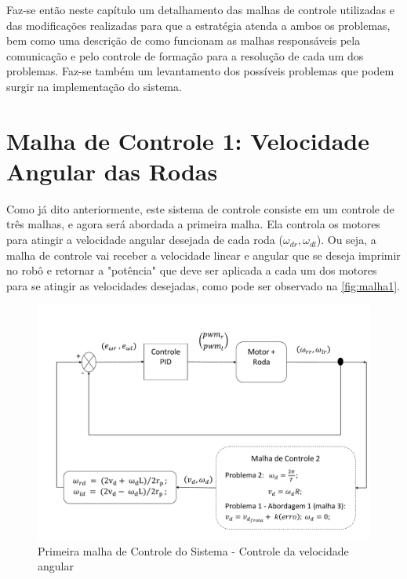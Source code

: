 Faz-se então neste capítulo um detalhamento das malhas de controle utilizadas e das modificações realizadas para que a estratégia atenda a ambos os problemas, bem como uma descrição de como funcionam as malhas responsáveis pela comunicação e pelo controle de formação para a resolução de cada um dos problemas. Faz-se também um levantamento dos possíveis problemas que podem surgir na implementação do sistema.   

\section{Malha de Controle 1: Velocidade Angular das Rodas}
\label{sec:malha1 } 
Como já dito anteriormente, este sistema de controle consiste em um controle de três malhas, e agora será abordada a primeira malha. Ela controla os motores para atingir a velocidade angular desejada de cada roda ($\omega_{dr},\omega_{dl}$). Ou seja, a malha de controle vai receber a velocidade linear e angular que se deseja imprimir no robô e retornar a "potência" que deve ser aplicada a cada um dos motores para se atingir as velocidades desejadas, como pode ser observado na \autoref{fig:malha1}.

\begin{figure}[!htb]
	\centering
	\includegraphics[width=1.0\textwidth]{./04-figuras/malha1}
	\caption{Primeira malha de Controle do Sistema - Controle da velocidade angular}
	\label{fig:malha1}
\end{figure}

